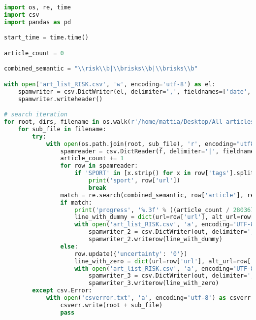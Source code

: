 \documentclass[12pt]{article}
\begin{document}
\begin{lstlisting}[language=Python,title=\textbf{Index construction.}]
import os, re, time
import csv
import pandas as pd

start_time = time.time()

article_count = 0

combined_semantic = "\\risk\\b|\\brisks\\b|\\brisks\\b"

with open('art_list_RISK.csv', 'w', encoding='utf-8') as el:
    spamwriter = csv.DictWriter(el, delimiter=',', fieldnames=['date', 'url', 'alt_url', 'tags', 'filename', 'uncertainty'], lineterminator='\n')
    spamwriter.writeheader()

# search iteration
for root, dirs, filename in os.walk(r'/home/mattia/Desktop/All_articles'):
    for sub_file in filename:
        try:
            with open(os.path.join(root, sub_file), 'r', encoding="utf8", errors='ignore') as f:
                spamreader = csv.DictReader(f, delimiter='|', fieldnames=['date', 'longdate', 'url', 'alt_url', 'header', 'article', 'tags'])
                article_count += 1
                for row in spamreader:
                    if 'SPORT' in [x.strip() for x in row['tags'].split(',')]:
                        print('sport', row['url'])
                        break
                match = re.search(combined_semantic, row['article'], re.IGNORECASE)
                if match:
                    print('progress', '%.3f' % ((article_count / 2803677) * 100), '%')
                    line_with_dummy = dict(url=row['url'], alt_url=row['alt_url'], date=row['date'], tags=row['tags'], filename=sub_file, uncertainty='1')
                    with open('art_list_RISK.csv', 'a', encoding='UTF-8') as out:
                        spamwriter_2 = csv.DictWriter(out, delimiter=',', fieldnames=['date', 'url', 'alt_url', 'tags', 'filename', 'uncertainty'], lineterminator='\n')
                        spamwriter_2.writerow(line_with_dummy)
                else:
                    row.update({'uncertainty': '0'})
                    line_with_zero = dict(url=row['url'], alt_url=row['alt_url'], date=row['date'], tags=row['tags'], filename=sub_file, uncertainty='0')
                    with open('art_list_RISK.csv', 'a', encoding='UTF-8') as out:
                        spamwriter_3 = csv.DictWriter(out, delimiter=',', fieldnames=['date', 'url', 'alt_url', 'tags', 'filename', 'uncertainty'], lineterminator='\n')
                        spamwriter_3.writerow(line_with_zero)
        except csv.Error:
            with open('csverror.txt', 'a', encoding='utf-8') as csverr:
                csverr.write(root + sub_file)
                pass


\end{lstlisting}
\end{document}
